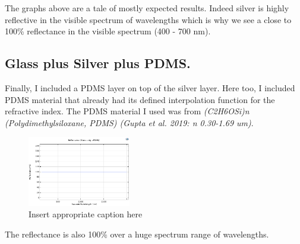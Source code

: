 The graphs above are a tale of mostly expected results. Indeed silver is highly reflective in the visible spectrum of wavelengths which is why we see a close to 100\% reflectance in the visible spectrum (400 - 700 nm).

\subsection{Glass plus Silver plus PDMS.}
Finally, I included a PDMS layer on top of the silver layer. Here too, I included PDMS material that already had its defined interpolation function for the refractive index. The PDMS material I used was from \emph{(C2H6OSi)n (Polydimethylsiloxane, PDMS) (Gupta et al. 2019: n 0.30-1.69 um)}.

\begin{figure}[ht!]
  \centering
  \includegraphics[width=0.4\textwidth]{Chapters/Figures/Chapter 4 Figures/Reflectance Results (Glass + Ag + PDMS).png}
  \caption{Insert appropriate caption here}
  \label{fig:Insert appropriate label here}
\end{figure}

The reflectance is also 100\% over a huge spectrum range of wavelengths.
